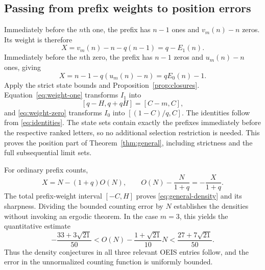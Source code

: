 \documentclass[11pt]{article}
\numberwithin{equation}{section}
\theoremstyle{definition}
\theoremstyle{remark}
\begin{document}
\subsection{Passing from prefix weights to position errors}
Immediately before the $n$th one, the prefix has $n-1$ ones and
$v_m(n)-n$ zeros. Its weight is therefore
\begin{equation}\label{eq:weight-one}
X=v_m(n)-n-q(n-1)=q-E_1(n).
\end{equation}
Immediately before the $n$th zero, the prefix has $n-1$ zeros and
$u_m(n)-n$ ones, giving
\begin{equation}\label{eq:weight-zero}
X=n-1-q(u_m(n)-n)=qE_0(n)-1.
\end{equation}
Apply the strict state bounds and Proposition~\ref{prop:closures}.
Equation~\eqref{eq:weight-one} transforms $I_1$ into
\[
[q-H,q+qH]=[C-m,C],
\]
and \eqref{eq:weight-zero} transforms $I_0$ into
$[(1-C)/q,C]$. The identities follow from \eqref{eq:identities}.
The state sets contain exactly the prefixes immediately before the
respective ranked letters, so no additional selection restriction is
needed. This proves the position part of Theorem~\ref{thm:general},
including strictness and the full subsequential limit sets.

For ordinary prefix counts,
\begin{equation}\label{eq:count-weight}
X=N-(1+q)O(N),\qquad
O(N)-\frac{N}{1+q}=-\frac{X}{1+q}.
\end{equation}
The total prefix-weight interval $[-C,H]$ proves
\eqref{eq:general-density} and its sharpness. Dividing the bounded
counting error by $N$ establishes the densities without invoking an
ergodic theorem. In the case $m=3$, this yields the quantitative estimate
\begin{equation}\label{eq:density3}
-\frac{33+3\sqrt{21}}{50}
<O(N)-\frac{1+\sqrt{21}}{10}N
<\frac{27+7\sqrt{21}}{50}.
\end{equation}
Thus the density conjectures in all three relevant OEIS entries follow,
and the error in the unnormalized counting function is uniformly bounded.
\end{document}
